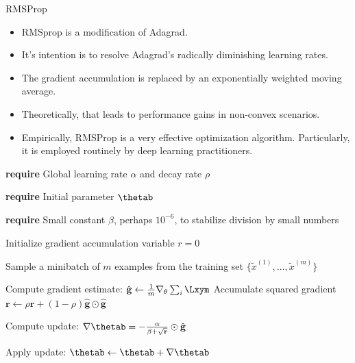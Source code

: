 
\begin{vbframe}{RMSProp}
  \begin{itemize}
    \item RMSprop is a modification of Adagrad.
    \item It's intention is to resolve Adagrad's radically diminishing learning rates.
    \item The gradient accumulation is replaced by an exponentially weighted moving average.
    \item Theoretically, that leads to performance gains in non-convex scenarios.
    \item Empirically, RMSProp is a very effective optimization algorithm. Particularly, it is employed routinely by deep learning practitioners.
  \end{itemize}
  
\framebreak
  
  
  \begin{algorithm}[H]
    \small
    \caption{RMSProp}
    \begin{algorithmic}[1]
    \State \textbf{require} Global learning rate $\alpha$ and decay rate $\rho$ \strut
    \State \textbf{require} Initial parameter $\mathbf{\thetab}$ \strut
    \State \parbox[t]{\dimexpr\linewidth-\algorithmicindent}{\textbf{require} Small constant $\beta$, perhaps $10^{-6}$, to stabilize division by small numbers \strut}
    \State Initialize gradient accumulation variable $r = 0$
        \State \parbox[t]{\dimexpr\linewidth-\algorithmicindent}{Sample a minibatch of $m$ examples from the training set $\{\tilde{x}^{(1)},\dots,\tilde{x}^{(m)}\}$ \strut}
        \State Compute gradient estimate: $\hat{\mathbf{g}} \leftarrow \frac{1}{m} \nabla_\theta \sum_{i} \Lxym$
        \State Accumulate squared gradient $\mathbf{r} \leftarrow \rho \mathbf{r} + (1 - \rho) \hat{\mathbf{g}} \odot  \hat{\mathbf{g}}$
        \State \parbox[t]{\dimexpr\linewidth-\algorithmicindent}{Compute update: $\nabla\mathbf{\thetab} = - \frac{\alpha}{\beta + \sqrt\mathbf{r}} \odot \hat{\mathbf{g}}$ \strut}
        \State Apply update: $\mathbf{\thetab} \leftarrow \mathbf{\thetab} + \nabla\mathbf{\thetab}$
      \EndWhile
    \end{algorithmic}
  \end{algorithm}
\end{vbframe}

